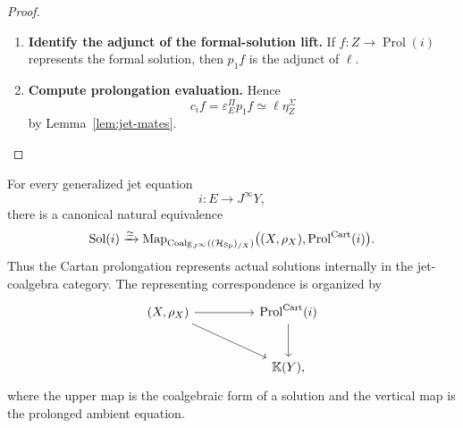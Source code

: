 \begin{proof}
\leavevmode
\begin{enumerate}[label=\textup{(\arabic*)}]
    \item \textbf{Identify the adjunct of the formal-solution lift.}
If \(f:Z\to \operatorname{Prol}(i)\) represents the formal solution, then \(p_1f\) is the
adjunct of \(\ell\).

    \item \textbf{Compute prolongation evaluation.}
Hence
\[
  c_if
  =
  \varepsilon^\Pi_Ep_1f
  \simeq
  \ell\eta^\Sigma_Z
\]
by Lemma~\ref{lem:jet-mates}.
\end{enumerate}
\end{proof}

\begin{theorem}
\label{thm:actual-solutions-prolongation}
For every generalized jet equation
\[
  i:E\longrightarrow J^\infty Y,
\]
there is a canonical natural equivalence
\[
  \operatorname{Sol}(i)
  \xrightarrow{\simeq}
  \operatorname{Map}_{\operatorname{Coalg}_{J^\infty}((\mathcal H_{\operatorname{Sp}})_{/X})}
  \bigl((X,\rho_X),\operatorname{Prol}^{\mathrm{Cart}}(i)\bigr).
\]
Thus the Cartan prolongation represents actual solutions internally in the
jet-coalgebra category. The representing correspondence is organized by
\[
\begin{tikzcd}[column sep=huge,row sep=large]
(X,\rho_X)
  \ar[r]
  \ar[dr]
&
\operatorname{Prol}^{\mathrm{Cart}}(i)
  \ar[d]
\\
&
\mathbb K(Y),
\end{tikzcd}
\]
where the upper map is the coalgebraic form of a solution and the vertical map
is the prolonged ambient equation.
\end{theorem}

